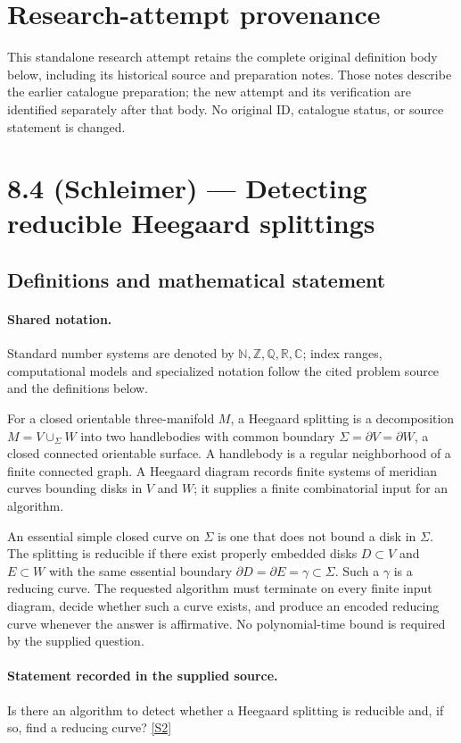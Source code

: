 \documentclass[11pt]{article}
\begin{document}
\section*{Research-attempt provenance}
This standalone research attempt retains the complete original definition body below,
including its historical source and preparation notes. Those notes describe the
earlier catalogue preparation; the new attempt and its verification are identified
separately after that body. No original ID, catalogue status, or source statement is changed.

\section{8.4 (Schleimer) — Detecting reducible Heegaard splittings}\label{statement}

\subsection{Definitions and mathematical statement}

\paragraph{Shared notation.}Standard number systems are denoted by $\mathbb N,\mathbb Z,\mathbb Q,\mathbb R,\mathbb C$; index ranges, computational models and specialized notation follow the cited problem source and the definitions below.


For a closed orientable three-manifold $M$, a Heegaard splitting is a decomposition $M=V\cup_\Sigma W$ into two handlebodies with common boundary $\Sigma=\partial V=\partial W$, a closed connected orientable surface. A handlebody is a regular neighborhood of a finite connected graph. A Heegaard diagram records finite systems of meridian curves bounding disks in $V$ and $W$; it supplies a finite combinatorial input for an algorithm.

An essential simple closed curve on $\Sigma$ is one that does not bound a disk in $\Sigma$. The splitting is reducible if there exist properly embedded disks $D\subset V$ and $E\subset W$ with the same essential boundary $\partial D=\partial E=\gamma\subset\Sigma$. Such a $\gamma$ is a reducing curve. The requested algorithm must terminate on every finite input diagram, decide whether such a curve exists, and produce an encoded reducing curve whenever the answer is affirmative. No polynomial-time bound is required by the supplied question.
\paragraph{Statement recorded in the supplied source.}
Is there an algorithm to detect whether a Heegaard splitting is reducible and, if so, find a reducing curve? \href{https://arxiv.org/pdf/1512.04620#page=6}{[S2]}
\end{document}
